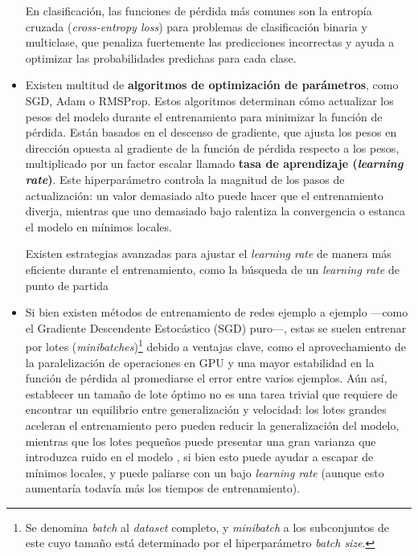\begin{itemize}
    En clasificación, las funciones de pérdida más comunes son la entropía cruzada (\textit{cross-entropy 
    loss}) para problemas de clasificación binaria y multiclase, que penaliza fuertemente las predicciones 
    incorrectas y ayuda a optimizar las probabilidades predichas para cada clase.


    \item Existen multitud de \textbf{algoritmos de optimización de parámetros}, como SGD, Adam o RMSProp. 
    Estos algoritmos determinan cómo actualizar los pesos del modelo durante el entrenamiento para minimizar 
    la función de pérdida. 
    Están basados en el descenso de gradiente, que ajusta los pesos en dirección opuesta al gradiente de 
    la función de pérdida respecto a los pesos, multiplicado por un factor escalar llamado \textbf{tasa 
    de aprendizaje (\textit{learning rate})}. Este hiperparámetro controla la magnitud de los pasos de 
    actualización: un valor demasiado alto puede hacer que el entrenamiento diverja, mientras que uno 
    demasiado bajo ralentiza la convergencia o estanca el modelo en mínimos locales.

    Existen estrategias avanzadas para ajustar el \textit{learning rate} de manera más eficiente durante el 
    entrenamiento, como la búsqueda de un \textit{learning rate} de punto de partida 


    \item Si bien existen métodos de entrenamiento de redes ejemplo a ejemplo ---como el Gradiente Descendente 
    Estocástico (SGD) puro\cite{bottou2010}---, estas se suelen entrenar por lotes 
    (\textit{minibatches})\footnote{
        Se denomina \textit{batch} al \textit{dataset} completo, y \textit{minibatch} a los subconjuntos de
        este cuyo tamaño está determinado por el hiperparámetro \textit{batch size}.
    } debido a ventajas clave, como el aprovechamiento de la paralelización de operaciones en GPU y una mayor 
    estabilidad en la función de pérdida al promediarse el error entre varios ejemplos. 
    Aún así, establecer un tamaño de lote óptimo no es una tarea trivial que requiere de encontrar un 
    equilibrio entre generalización y velocidad: los lotes grandes aceleran el entrenamiento pero pueden 
    reducir la generalización del modelo, mientras que los lotes pequeños puede presentar una gran varianza 
    que introduzca ruido en el modelo \cite{keskar2017}, si bien esto puede ayudar a escapar de mínimos 
    locales, y puede paliarse con un bajo \textit{learning rate} (aunque esto aumentaría todavía más los 
    tiempos de entrenamiento).
    


\end{itemize}
